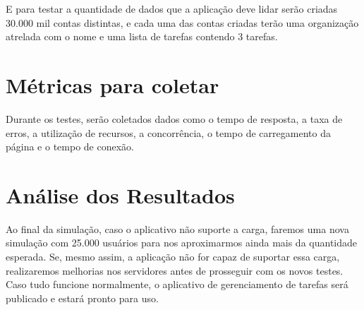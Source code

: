 E para testar a quantidade de dados que a aplicação deve lidar serão criadas 30.000 mil contas distintas, e cada uma das contas criadas terão uma organização atrelada com o nome e uma lista de tarefas contendo 3 tarefas.

\section*{Métricas para coletar}
Durante os testes, serão coletados dados como o tempo de resposta, a taxa de erros, a utilização de recursos, a concorrência, o tempo de carregamento da página e o tempo de conexão.

\section*{Análise dos Resultados}

Ao final da simulação, caso o aplicativo não suporte a carga, faremos uma nova simulação com 25.000 usuários para nos aproximarmos ainda mais da quantidade esperada. Se, mesmo assim, a aplicação não for capaz de suportar essa carga, realizaremos melhorias nos servidores antes de prosseguir com os novos testes. Caso tudo funcione normalmente, o aplicativo de gerenciamento de tarefas será publicado e estará pronto para uso.